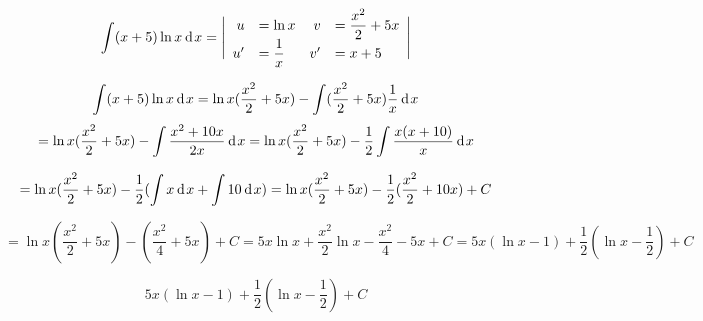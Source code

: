 {}

$$
  \int (x+5)\ln{x}\hspace{2pt}\text{d}\hspace{1pt}{x} =
  \Bigg|
    \begin{array}{r l r l   }
        u  & = \ln{x} & v & = \dfrac{x^2}{2}+5x \\
        u' & = \dfrac{1}{x} & v' & = x+5  \\
      \end{array}
  \Bigg|
$$


$$
  \int (x+5)\ln{x}\hspace{2pt}\text{d}\hspace{1pt}{x}
= \ln{x} (\dfrac{x^2}{2}+5x) - \int (\dfrac{x^2}{2}+5x) \dfrac{1}{x} \hspace{2pt}\text{d}\hspace{1pt}{x}
$$
$$
= \ln{x} (\dfrac{x^2}{2}+5x) - \int \dfrac{x^2+10x}{2x}\hspace{2pt}\text{d}\hspace{1pt}{x}
= \ln{x} (\dfrac{x^2}{2}+5x) - \dfrac{1}{2}\int \dfrac{x(x+10)}{x}\hspace{2pt}\text{d}\hspace{1pt}{x}
$$

$$
= \ln{x} (\dfrac{x^2}{2}+5x) - \dfrac{1}{2} ( \int x\hspace{2pt}\text{d}\hspace{1pt}{x} + \int 10\hspace{2pt}\text{d}\hspace{1pt}{x} )
= \ln{x} (\dfrac{x^2}{2}+5x) - \dfrac{1}{2} ( \dfrac{x^2}{2} + 10x) + C
$$

$$
= \ln{x} (\dfrac{x^2}{2}+5x) - ( \dfrac{x^2}{4} + 5x) + C
= 5x\ln{x} + \dfrac{x^2}{2}\ln{x} - \dfrac{x^2}{4} - 5x + C
= 5x(\ln{x}-1) + \dfrac{1}{2}(\ln{x}-\dfrac{1}{2}) + C
$$

$$\boxed{5x(\ln{x}-1) + \dfrac{1}{2}(\ln{x}-\dfrac{1}{2}) + C}$$
